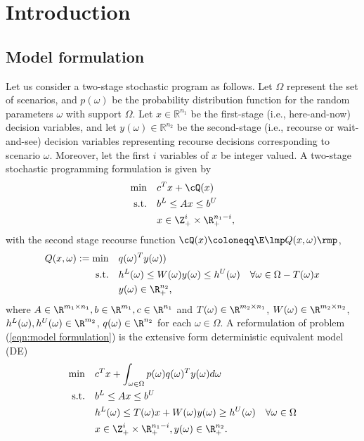 \section{Introduction}
\label{sec:Introduction}


\subsection{Model formulation}
\label{subsec:Model formulation}

Let us consider a two-stage stochastic program as follows. Let $\Omega$ represent the set of scenarios, and $p(\omega)$ be the probability distribution function for the random parameters $\omega$ with support $\Omega$. Let $x \in \mathbb{R}^{n_1}$ be the first-stage (i.e., here-and-now) decision variables, and let $y(\omega) \in \mathbb{R}^{n_2}$ be the second-stage (i.e., recourse or wait-and-see) decision variables representing recourse decisions corresponding to scenario $\omega$. Moreover, let the first $i$ variables of $x$ be integer valued. A two-stage stochastic programming formulation is given by
\begin{subequations} \label{eqn:master problem}
\begin{align}
  \min \quad & c^T x + \cQ(x) \\
  \text{s.t.} \quad
  & b^L \leq A x \leq b^U \\
  & x \in \Z^{i}_{+} \times \R^{n_1 - i}_{+},
\end{align}
\end{subequations}
with the second stage recourse function $\cQ(x)\coloneqq \E \lmp Q(x, \omega) \rmp$,
\begin{subequations} \label{eqn:subproblem}
\begin{align}
  Q(x, \omega):= \min \quad & q(\omega)^T y(\omega)) \\
  \text{s.t.} \quad
  & h^L(\omega) \leq W(\omega) y(\omega) \leq h^U(\omega) \quad \forall \omega \in \Omega - T(\omega) x\\
  & y(\omega)  \in \R^{n_2}_{+},
\end{align}
\end{subequations}
where $A \in \R^{m_1 \times n_1}, b \in \R^{m_1}, c \in \R^{n_1}$ and $T(\omega) \in \R^{m_2 \times n_1}$, $W(\omega) \in \R^{m_2 \times n_2}$, $h^L(\omega), h^U(\omega) \in \R^{m_2}$, $q(\omega) \in \R^{n_2}$ for each $\omega \in \Omega$.
A reformulation of problem (\ref{eqn:model formulation}) is the extensive form deterministic equivalent model (DE)
\begin{subequations} \label{eqn:model formulation}
\begin{align}
  \min \quad & c^T x + \int_{\omega \in \Omega} p(\omega) q(\omega)^T y(\omega) d\omega \\
  \text{s.t.} \quad
  & b^L \leq A x \leq b^U \\
  & h^L(\omega) \leq T(\omega) x + W(\omega) y(\omega) \geq h^U(\omega) \quad \forall \omega \in \Omega \\
  & x \in \Z^{i}_{+} \times \R^{n_1 - i}_{+}, y(\omega) \in \R^{n_2}_{+}.
\end{align}
\end{subequations}
